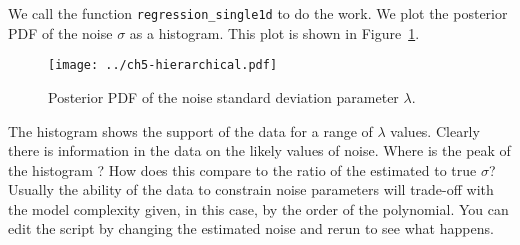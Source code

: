 \documentclass{tufte-handout}
\begin{document}
We call the function {\tt regression\_single1d} to do the work. 
We plot the posterior PDF of the noise $\sigma$ as a histogram. 
This plot is shown in Figure~\ref{fig:histogram}.

\begin{figure}
\texttt{[image: ../ch5-hierarchical.pdf]}
\caption{Posterior PDF of the noise standard deviation parameter $\lambda$.}
\label{fig:histogram}
\end{figure}

The histogram shows the support of the data for a range of $\lambda$ values. 
Clearly there is information in the data on the likely values of noise.
Where is the peak of the histogram ? How does this compare to the ratio of the estimated
to true $\sigma$? Usually the ability of the data to constrain noise parameters will trade-off 
with the model complexity given, in this case, by the order of the polynomial.
You can edit the script by changing the estimated noise and rerun to see what happens.
\end{document}
